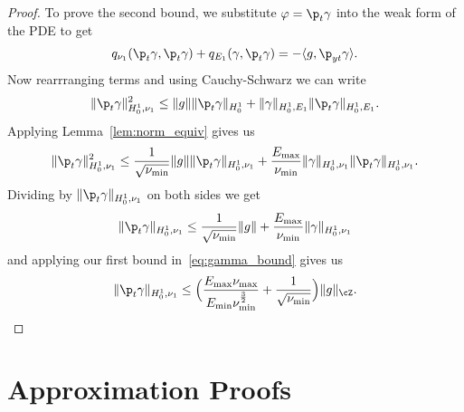 \documentclass[letterpaper,11pt]{article}
\begin{document}
\begin{proof}
To prove the second bound, we substitute $\varphi = \p_t\gamma$ into the weak form of the PDE to get
\begin{align*}
    q_{\nu_1}(\p_t\gamma, \p_t\gamma) + q_{E_1}(\gamma, \p_t\gamma) = -\langle g, \p_{yt}\gamma\rangle.
\end{align*}
Now rearrranging terms and using Cauchy-Schwarz we can write
\begin{align*}
    \|\p_t\gamma\|_{H_0^1, \nu_1}^2 \leq \|g\|\|\p_t\gamma\|_{H_0^1} + \|\gamma\|_{H_0^1, E_1}\|\p_t\gamma\|_{H_0^1, E_1}.
\end{align*}
Applying Lemma~\ref{lem:norm_equiv} gives us
\begin{align*}
    \|\p_t\gamma\|_{H_0^1, \nu_1}^2 \leq \frac{1}{\sqrt{\nu_{\min}}}\|g\|\|\p_t\gamma\|_{H_0^1, \nu_1} + \frac{E_{\max}}{\nu_{\min}}\|\gamma\|_{H_0^1, \nu_1}\|\p_t\gamma\|_{H_0^1, \nu_1}.
\end{align*}
Dividing by $\|\p_t\gamma\|_{H_0^1, \nu_1}$ on both sides we get
\begin{align*}
    \|\p_t\gamma\|_{H_0^1, \nu_1} \leq \frac{1}{\sqrt{\nu_{\min}}}\|g\| + \frac{E_{\max}}{\nu_{\min}}\|\gamma\|_{H_0^1, \nu_1}
\end{align*}
and applying our first bound in~\eqref{eq:gamma_bound} gives us
\begin{equation}
    \|\p_t\gamma\|_{H_0^1, \nu_1} \leq \Big(\frac{E_{\max}\nu_{\max}}{E_{\min}\nu_{\min}^\frac{3}{2}} + \frac{1}{\sqrt{\nu_{\min}}}\Big)\|g\|_\cZ.
\end{equation}
\end{proof}

\section{Approximation Proofs}
\label{sec:UA}
\end{document}
